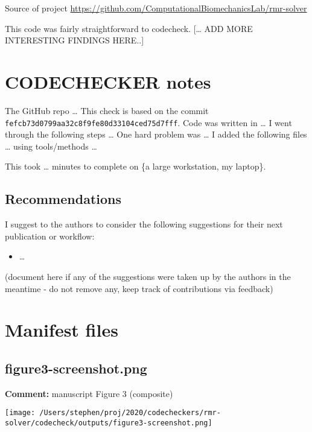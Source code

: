 \documentclass[
]{article}
\providecommand{\tightlist}{%
  \setlength{\itemsep}{0pt}\setlength{\parskip}{0pt}}
\begin{document}
Source of project
\url{https://github.com/ComputationalBiomechanicsLab/rmr-solver}

This code was fairly straightforward to codecheck. {[}\ldots{} ADD MORE
INTERESTING FINDINGS HERE..{]}

\clearpage

\section{CODECHECKER notes}\label{codechecker-notes}

The GitHub repo \ldots{} This check is based on the commit
\texttt{fefcb73d0799aa32c8f9fe80d33104ced75d7fff}. Code was written in
\ldots{} I went through the following steps \ldots{} One hard problem
was \ldots{} I added the following files \ldots{} using tools/methods
\ldots{}

This took \ldots{} minutes to complete on \{a large workstation, my
laptop\}.

\subsection{Recommendations}\label{recommendations}

I suggest to the authors to consider the following suggestions for their
next publication or workflow:

\begin{itemize}
\tightlist
\item
  \ldots{}
\end{itemize}

(document here if any of the suggestions were taken up by the authors in
the meantime - do not remove any, keep track of contributions via
feedback)

\clearpage

\section{Manifest files}\label{manifest-files}

\subsection{figure3-screenshot.png}\label{figure3-screenshot.png}

\textbf{Comment:} manuscript Figure 3 (composite)

\texttt{[image: /Users/stephen/proj/2020/codecheckers/rmr-solver/codecheck/outputs/figure3-screenshot.png]}
\clearpage 
\end{document}
